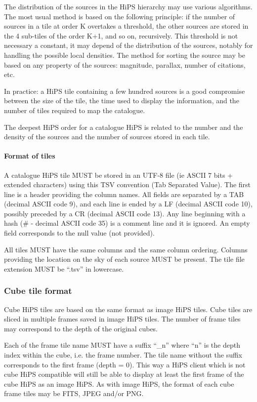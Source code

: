 \documentclass[11pt,a4paper]{ivoa}
\begin{document}
The distribution of the sources in the HiPS hierarchy may use various algorithms. The most usual method is based on the following principle: if the number of sources in a tile at order K overtakes a threshold, the other sources are stored in the 4 sub-tiles of the order K+1, and so on, recursively. This threshold is not necessary a constant, it may depend of the distribution of the sources, notably for handling the possible local densities. The method for sorting the source may be based on any property of the sources: magnitude, parallax, number of citations, etc.

In practice: a HiPS tile containing a few hundred sources is a good compromise between the size of the tile, the time used to display the information, and the number of tiles required to map the catalogue.

The deepest HiPS order for a catalogue HiPS is related to the number and the density of the sources and the number of sources stored in each tile.

\paragraph{Format of tiles}

A catalogue HiPS tile MUST be stored in an UTF-8 file (ie ASCII 7 bits + extended characters) using this TSV convention (Tab Separated Value). The first line is a header providing the column names. All fields are separated by a TAB (decimal ASCII code 9), and each line is ended by a LF (decimal ASCII code 10), possibly preceded by a CR (decimal ASCII code 13). Any line beginning with a hash (\# - decimal ASCII code 35) is a comment line and it is ignored. An empty field corresponds to the null value (not provided).

All tiles MUST have the same columns and the same column ordering. Columns providing the location on the sky of each source MUST be present. The tile file extension MUST be ``.tsv'' in lowercase.

\subsubsection{Cube tile format}

Cube HiPS tiles are based on the same format as image HiPS tiles. Cube tiles are sliced in multiple frames saved in image HiPS tiles. The number of frame tiles may correspond to the depth of the original cubes. 

Each of the frame tile name MUST have a suffix ``\_n'' where ``n'' is the depth index within the cube, i.e. the frame number. The tile name without the suffix corresponds to the first frame (depth = 0). This way a HiPS client which is not cube HiPS compatible will still be able to display at least the first frame of the cube HiPS as an image HiPS. As with image HiPS, the format of each cube frame tiles may be FITS, JPEG and/or PNG.
\end{document}
